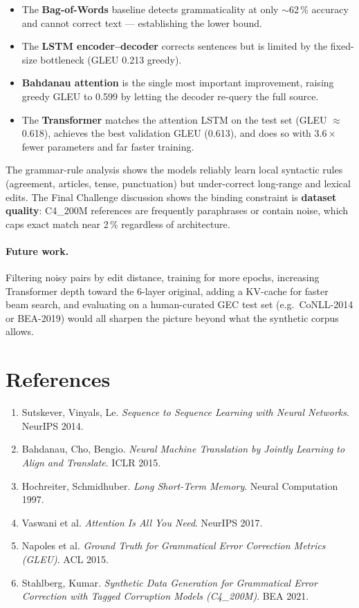 \documentclass[11pt,a4paper]{article}
\begin{document}
\begin{itemize}[noitemsep]
  \item The \textbf{Bag-of-Words} baseline detects grammaticality at only
        $\sim$62\,\% accuracy and cannot correct text --- establishing the lower
        bound.
  \item The \textbf{LSTM encoder--decoder} corrects sentences but is limited by
        the fixed-size bottleneck (GLEU 0.213 greedy).
  \item \textbf{Bahdanau attention} is the single most important improvement,
        raising greedy GLEU to 0.599 by letting the decoder re-query the full
        source.
  \item The \textbf{Transformer} matches the attention LSTM on the test set
        (GLEU $\approx$0.618), achieves the best validation GLEU (0.613), and
        does so with $3.6\times$ fewer parameters and far faster training.
\end{itemize}

The grammar-rule analysis shows the models reliably learn local syntactic rules
(agreement, articles, tense, punctuation) but under-correct long-range and
lexical edits. The Final Challenge discussion shows the binding constraint is
\textbf{dataset quality}: C4\_200M references are frequently paraphrases or
contain noise, which caps exact match near 2\,\% regardless of architecture.

\paragraph{Future work.} Filtering noisy pairs by edit distance, training for
more epochs, increasing Transformer depth toward the 6-layer original, adding a
KV-cache for faster beam search, and evaluating on a human-curated GEC test set
(e.g.\ CoNLL-2014 or BEA-2019) would all sharpen the picture beyond what the
synthetic corpus allows.

\section*{References}
\begin{enumerate}[noitemsep,leftmargin=2em]
  \item Sutskever, Vinyals, Le. \emph{Sequence to Sequence Learning with Neural
        Networks}. NeurIPS 2014.
  \item Bahdanau, Cho, Bengio. \emph{Neural Machine Translation by Jointly
        Learning to Align and Translate}. ICLR 2015.
  \item Hochreiter, Schmidhuber. \emph{Long Short-Term Memory}. Neural
        Computation 1997.
  \item Vaswani et al. \emph{Attention Is All You Need}. NeurIPS 2017.
  \item Napoles et al. \emph{Ground Truth for Grammatical Error Correction
        Metrics (GLEU)}. ACL 2015.
  \item Stahlberg, Kumar. \emph{Synthetic Data Generation for Grammatical Error
        Correction with Tagged Corruption Models (C4\_200M)}. BEA 2021.
\end{enumerate}
\end{document}
